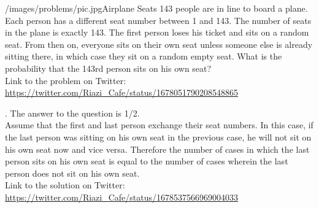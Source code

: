 \begin{problem}{/images/problems/pic.jpg}{Airplane Seats}
    143 people are in line to board a plane. Each person has a different seat number between 1 and 143. The number of seats in the plane is exactly 143. The first person loses his ticket and sits on a random seat. From then on, everyone sits on their own seat unless someone else is already sitting there, in which case they sit on a random empty seat. What is the probability that the 143rd person  sits on his own seat?\\[0.2cm]

Link to the problem on Twitter:  \url{https://twitter.com/Riazi_Cafe/status/1678051790208548865}
\end{problem}
\begin{solution}.
The answer to the question is 1/2.\\[0.2cm]

Assume that the first and last person exchange their seat numbers. In this case, if the last person was sitting on his own seat in the previous case, he will not sit on his own seat now and vice versa. Therefore the number of cases in which the last person sits on his own seat is equal to the number of cases wherein the last person does not sit on his own seat.\\[0.2cm]

Link to the solution on Twitter:  \url{https://twitter.com/Riazi_Cafe/status/1678537566969004033}
\end{solution}